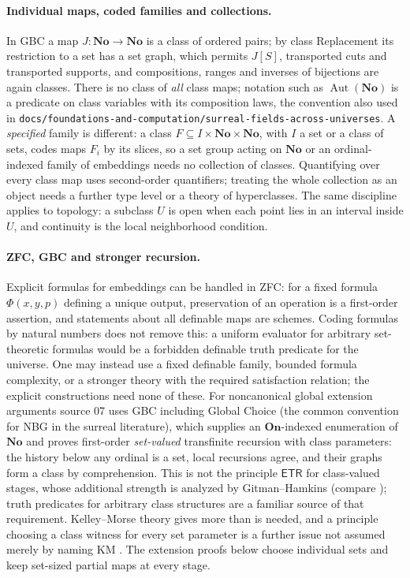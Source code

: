 \documentclass[11pt,a4paper]{article}
\numberwithin{equation}{section}
\theoremstyle{plain}
\theoremstyle{definition}
\theoremstyle{remark}
\newcommand{\No}{\mathbf{No}}
\newcommand{\On}{\mathbf{On}}
\newcommand{\fn}[1]{\nolinkurl{#1}}%
\begin{document}
\paragraph{Individual maps, coded families and collections.} In GBC a map
$J:\No\to\No$ is a class of ordered pairs; by class Replacement its
restriction to a set has a set graph, which permits $J[S]$, transported cuts
and transported supports, and compositions, ranges and inverses of
bijections are again classes. There is no class of \emph{all} class maps;
notation such as $\operatorname{Aut}(\No)$ is a predicate on class variables
with its composition laws, the convention also used in
\fn{docs/foundations-and-computation/surreal-fields-across-universes}. A
\emph{specified} family is different: a class $F\subseteq I\times\No\times\No$,
with $I$ a set or a class of sets, codes maps $F_i$ by its slices, so a set
group acting on $\No$ or an ordinal-indexed family of embeddings needs no
collection of classes. Quantifying over every class map uses second-order
quantifiers; treating the whole collection as an object needs a further type
level or a theory of hyperclasses. The same discipline applies to topology:
a subclass $U$ is open when each point lies in an interval inside $U$, and
continuity is the local neighborhood condition.

\paragraph{ZFC, GBC and stronger recursion.} Explicit formulas for embeddings
can be handled in ZFC: for a fixed formula $\Phi(x,y,p)$ defining a unique
output, preservation of an operation is a first-order assertion, and
statements about all definable maps are schemes. Coding formulas by natural
numbers does not remove this: a uniform evaluator for arbitrary
set-theoretic formulas would be a forbidden definable truth predicate for
the universe. One may instead use a fixed definable family, bounded formula
complexity, or a stronger theory with the required satisfaction relation; the
explicit constructions need none of these. For noncanonical global extension
arguments source 07 uses GBC including Global Choice (the common convention
for NBG in the surreal literature), which supplies an $\On$-indexed
enumeration of $\No$ and proves first-order \emph{set-valued} transfinite
recursion with class parameters: the history below any ordinal is a set,
local recursions agree, and their graphs form a class by comprehension. This
is not the principle $\mathsf{ETR}$ for class-valued stages, whose additional
strength is analyzed by Gitman--Hamkins \cite{at-GitmanHamkins} (compare
\cite{HamkinsETR}); truth predicates for arbitrary class structures are a
familiar source of that requirement. Kelley--Morse theory gives more than is
needed, and a principle choosing a class witness for every set parameter is a
further issue not assumed merely by naming KM \cite[Section~2]{an-AntosGitman}.
The extension proofs below choose individual sets and keep set-sized partial
maps at every stage.
\end{document}
